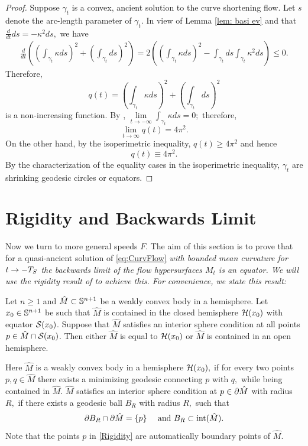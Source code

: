 \documentclass{amsart}
\begin{document}
\begin{proof}
Suppose $\gamma_t$ is a convex, ancient solution to the curve shortening flow. Let $s$ denote the arc-length parameter of $\gamma_t$. In view of Lemma \ref{lem: basi ev} and that $\frac{d}{dt}ds=-\kappa^2ds,$ we have 
\begin{align*}
\frac{d}{dt}\left(\left(\int_{\gamma_t}\kappa ds\right)^2+\left(\int_{\gamma_t}ds\right)^2\right)=2\left(\left(\int_{\gamma_t}\kappa ds\right)^2-\int_{\gamma_t}ds\int_{\gamma_t}\kappa^2ds\right)\leq 0.
\end{align*}
Therefore, 
\[q(t) = \left(\int_{\gamma_t}\kappa ds\right)^2+\left(\int_{\gamma_t}ds\right)^2 \]
is a non-increasing function. By \cite[Lemma 4.1]{BryanLouie:04/2016}, $\lim\limits_{t\to-\infty}\int_{\gamma_t}\kappa ds=0;$ therefore,
\[
\lim_{t\to \infty} q(t) = 4 \pi^2.
\]
On the other hand, by the isoperimetric inequality, $q(t) \geq 4\pi^2$ and hence $$q(t)\equiv 4\pi^2.$$
By the characterization of the equality cases in the isoperimetric inequality, $\gamma_t$ are shrinking geodesic circles or equators.
\end{proof}
\section{Rigidity and Backwards Limit}\label{sec:rigidity}
Now we turn to more general speeds \(F\). The aim of this section is to prove that for a quasi-ancient solution of \eqref{eq:CurvFlow} \it{with bounded mean curvature} for $t\ra -T_S$ the backwards limit of the flow hypersurfaces $M_t$  is an equator. We will use the rigidity result of \cite{MakowskiScheuer:/2013} to achieve this. For convenience, we state this result:
\begin{thm}\label{Rigidity}\textsc{\cite[Theorem 1.1]{MakowskiScheuer:/2013}}
Let $ n\geq 1$ and $\hat{M}\subset \S^{n+1}$ be a weakly convex body in a hemisphere. Let $x_0\in \S^{n+1}$ be such that $\hat{M}$ is contained in the closed hemisphere $\mc{H}(x_0)$ with equator $\mc{S}(x_{0})$. Suppose that $\hat{M}$ satisfies an interior sphere condition at all points $p\in \hat{M} \cap \mc{S}(x_0)$. Then either $\hat{M}$ is equal to $\mc{H}(x_0)$ or $\hat{M}$ is contained in an open hemisphere.
\end{thm}
Here $\hat{M}$ is a weakly convex body in a hemisphere $\mc{H}(x_0),$ if for every two points $p,q\in\hat{M}$ there exists a minimizing geodesic connecting $p$ with $q,$ while being contained in $\hat{M}.$ $\hat{M}$ satisfies an interior sphere condition at $p\in \del\hat{M}$ with radius $R,$ if there exists a geodesic ball $B_R$ with radius $R,$ such that
\[\del B_R\cap\del \hat{M}=\{p\}\quad~\text{and}~B_R\sub\mrm{int}(\hat{M}). \]
Note that the points $p$ in \cref{Rigidity} are automatically boundary points of $\hat{M}.$
\end{document}
